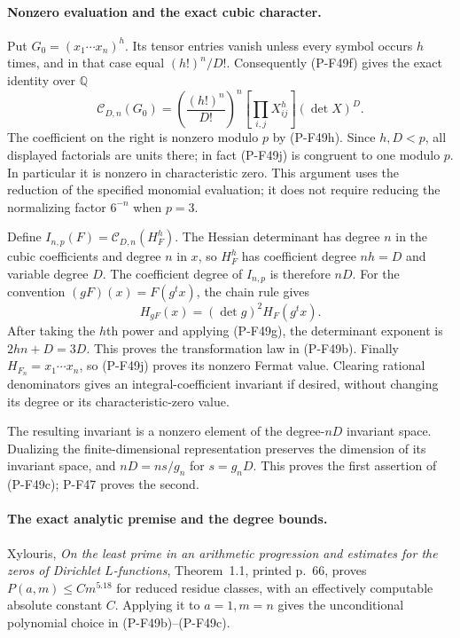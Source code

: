 \paragraph{Nonzero evaluation and the exact cubic character.}
Put $G_0=(x_1\cdots x_n)^h$. Its tensor entries vanish
unless every symbol occurs $h$ times, and in that case
equal $(h!)^n/D!$. Consequently (P-F49f) gives the exact
identity over $\mathbb Q$
\[
 \mathcal C_{D,n}(G_0)
       =\left(\frac{(h!)^n}{D!}\right)^n
              [\prod_{i,j}X_{ij}^{h}](\det X)^D.
                                                        \tag{P-F49j}
\]
The coefficient on the right is nonzero modulo $p$
by (P-F49h). Since $h,D<p$, all displayed factorials
are units there; in fact (P-F49j) is congruent to one
modulo $p$. In particular it is nonzero in characteristic
zero. This argument uses the reduction of the specified
monomial evaluation; it does not require reducing the
normalizing factor $6^{-n}$ when $p=3$.

Define $I_{n,p}(F)=\mathcal C_{D,n}(H_F^h)$.
The Hessian determinant has degree $n$ in the cubic
coefficients and degree $n$ in $x$, so $H_F^h$ has
coefficient degree $nh=D$ and variable degree $D$.
The coefficient degree of $I_{n,p}$ is therefore $nD$.
For the convention $(gF)(x)=F(g^t x)$, the chain rule
gives
\[
            H_{gF}(x)=(\det g)^2H_F(g^t x).
                                                        \tag{P-F49k}
\]
After taking the $h$th power and applying (P-F49g),
the determinant exponent is $2hn+D=3D$. This proves
the transformation law in (P-F49b). Finally
$H_{F_n}=x_1\cdots x_n$, so (P-F49j) proves its nonzero
Fermat value. Clearing rational denominators gives an
integral-coefficient invariant if desired, without
changing its degree or its characteristic-zero value.

The resulting invariant is a nonzero element of the
degree-$nD$ invariant space. Dualizing the finite-dimensional
representation preserves the dimension of its invariant
space, and $nD=ns/g_n$ for $s=g_nD$. This proves the
first assertion of (P-F49c); P-F47 proves the second.

\paragraph{The exact analytic premise and the degree bounds.}
Xylouris, \emph{On the least prime in an arithmetic
progression and estimates for the zeros of Dirichlet
$L$-functions}, Theorem~1.1, printed p.~66, proves
$P(a,m)\le C m^{5.18}$ for reduced residue classes,
with an effectively computable absolute constant $C$.
Applying it to $a=1,m=n$ gives the unconditional
polynomial choice in (P-F49b)--(P-F49c).

